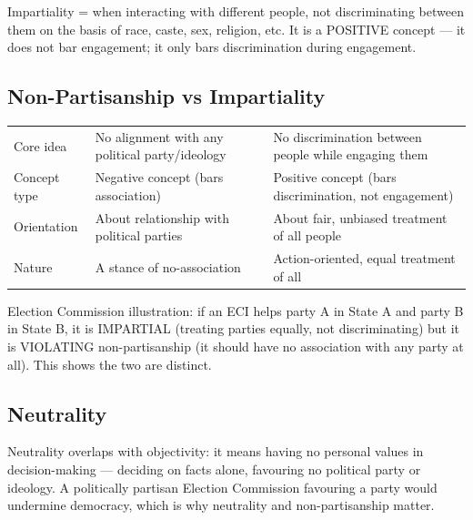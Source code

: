 \begin{KeyConcept}
Impartiality = when interacting with different people, not discriminating between them on the basis of race, caste, sex, religion, etc. It is a POSITIVE concept --- it does not bar engagement; it only bars discrimination during engagement.
\end{KeyConcept}

\subsection{Non-Partisanship vs Impartiality}

\begin{center}
\begin{tabularx}{\textwidth}{>{\raggedright\arraybackslash}p{2.4cm} Y Y}
 &  &  \\
\toprule
Core idea & No alignment with any political party/ideology & No discrimination between people while engaging them \\
Concept type & Negative concept (bars association) & Positive concept (bars discrimination, not engagement) \\
Orientation & About relationship with political parties & About fair, unbiased treatment of all people \\
Nature & A stance of no-association & Action-oriented, equal treatment of all \\
\bottomrule
\end{tabularx}
\end{center}

\begin{ExampleBox}
Election Commission illustration: if an ECI helps party A in State A and party B in State B, it is IMPARTIAL (treating parties equally, not discriminating) but it is VIOLATING non-partisanship (it should have no association with any party at all). This shows the two are distinct.
\end{ExampleBox}

\subsection{Neutrality}

Neutrality overlaps with objectivity: it means having no personal values in decision-making --- deciding on facts alone, favouring no political party or ideology. A politically partisan Election Commission favouring a party would undermine democracy, which is why neutrality and non-partisanship matter.

